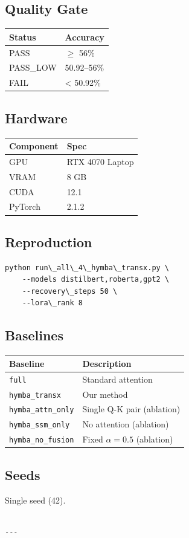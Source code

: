 \subsection{Quality Gate}

\begin{table}[H]
\centering
\small
\begin{tabular}{ll}
\toprule
\textbf{Status} & \textbf{Accuracy} \\
\midrule
PASS & $\ge$ 56\% \\
PASS\_LOW & 50.92--56\% \\
FAIL & \textless{} 50.92\% \\
\bottomrule
\end{tabular}
\end{table}

\subsection{Hardware}

\begin{table}[H]
\centering
\small
\begin{tabular}{ll}
\toprule
\textbf{Component} & \textbf{Spec} \\
\midrule
GPU & RTX 4070 Laptop \\
VRAM & 8 GB \\
CUDA & 12.1 \\
PyTorch & 2.1.2 \\
\bottomrule
\end{tabular}
\end{table}

\subsection{Reproduction}

\begin{lstlisting}
python run\_all\_4\_hymba\_transx.py \
    --models distilbert,roberta,gpt2 \
    --recovery\_steps 50 \
    --lora\_rank 8
\end{lstlisting}

\subsection{Baselines}

\begin{table}[H]
\centering
\small
\begin{tabular}{ll}
\toprule
\textbf{Baseline} & \textbf{Description} \\
\midrule
\texttt{full} & Standard attention \\
\texttt{hymba\_transx} & Our method \\
\texttt{hymba\_attn\_only} & Single Q-K pair (ablation) \\
\texttt{hymba\_ssm\_only} & No attention (ablation) \\
\texttt{hymba\_no\_fusion} & Fixed $\alpha = 0.5$ (ablation) \\
\bottomrule
\end{tabular}
\end{table}

\subsection{Seeds}

Single seed (42).
\begin{lstlisting}

---
\end{lstlisting}